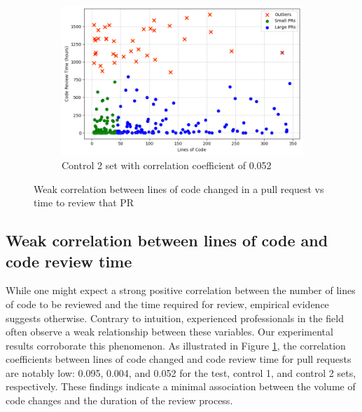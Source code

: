 \begin{figure}[htbp]
    \centering
    \begin{subfigure}[t]{\columnwidth}
        \centering
        \includegraphics[scale=0.35]{Figures/control2_dist.png}
        \caption{Control 2 set with correlation coefficient of 0.052}
    \end{subfigure}%

    \caption{Weak correlation between lines of code changed in a pull request vs time to review that PR}
\label{fig:loc_vs_review_time_distribution}    
\end{figure}

\subsection{Weak correlation between lines of code and code review time}
While one might expect a strong positive correlation between the number of lines of code to be reviewed and the time required for review, empirical evidence suggests otherwise. Contrary to intuition, experienced professionals in the field often observe a weak relationship between these variables. Our experimental results corroborate this phenomenon. As illustrated in Figure \ref{fig:loc_vs_review_time_distribution}, the correlation coefficients between lines of code changed and code review time for pull requests are notably low: 0.095, 0.004, and 0.052 for the test, control 1, and control 2 sets, respectively. These findings indicate a minimal association between the volume of code changes and the duration of the review process.

